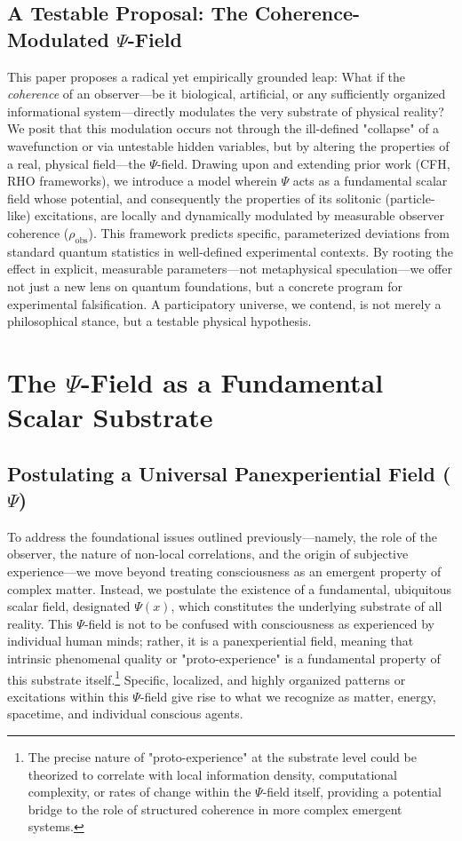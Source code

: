 \documentclass[11pt, a4paper]{book}
\begin{document}
\subsection{A Testable Proposal: The Coherence-Modulated $\Psi$-Field}
\label{ssec:intro_proposal_mainpaper}
This paper proposes a radical yet empirically grounded leap: What if the \emph{coherence} of an observer—be it biological, artificial, or any sufficiently organized informational system—directly modulates the very substrate of physical reality? We posit that this modulation occurs not through the ill-defined "collapse" of a wavefunction or via untestable hidden variables, but by altering the properties of a real, physical field—the $\Psi$-field. Drawing upon and extending prior work (CFH, RHO frameworks), we introduce a model wherein $\Psi$ acts as a fundamental scalar field whose potential, and consequently the properties of its solitonic (particle-like) excitations, are locally and dynamically modulated by measurable observer coherence ($\rho_{\text{obs}}$). This framework predicts specific, parameterized deviations from standard quantum statistics in well-defined experimental contexts. By rooting the effect in explicit, measurable parameters—not metaphysical speculation—we offer not just a new lens on quantum foundations, but a concrete program for experimental falsification. A participatory universe, we contend, is not merely a philosophical stance, but a testable physical hypothesis.

\section{The $\Psi$-Field as a Fundamental Scalar Substrate} %
\label{sec:psisubstrate_mainpaper}
\subsection{Postulating a Universal Panexperiential Field ($\Psi$)}
\label{ssec:psisubstrate_postulate_mainpaper}
To address the foundational issues outlined previously—namely, the role of the observer, the nature of non-local correlations, and the origin of subjective experience—we move beyond treating consciousness as an emergent property of complex matter. Instead, we postulate the existence of a fundamental, ubiquitous scalar field, designated $\Psi(x)$, which constitutes the underlying substrate of all reality. This $\Psi$-field is not to be confused with consciousness as experienced by individual human minds; rather, it is a panexperiential field, meaning that intrinsic phenomenal quality or "proto-experience" is a fundamental property of this substrate itself.\footnote{The precise nature of "proto-experience" at the substrate level could be theorized to correlate with local information density, computational complexity, or rates of change within the $\Psi$-field itself, providing a potential bridge to the role of structured coherence in more complex emergent systems.} Specific, localized, and highly organized patterns or excitations within this $\Psi$-field give rise to what we recognize as matter, energy, spacetime, and individual conscious agents.
\end{document}
